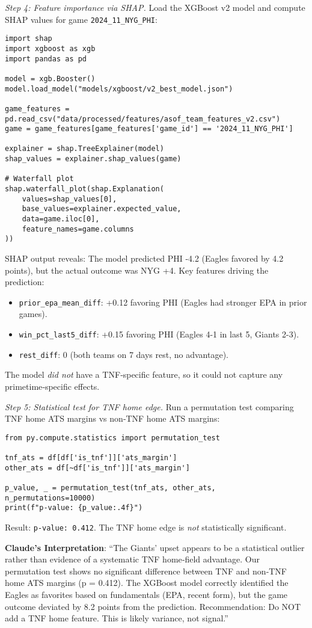 \textit{Step 4: Feature importance via SHAP.}
Load the XGBoost v2 model and compute SHAP values for game \texttt{2024\_11\_NYG\_PHI}:
\begin{verbatim}
import shap
import xgboost as xgb
import pandas as pd

model = xgb.Booster()
model.load_model("models/xgboost/v2_best_model.json")

game_features = pd.read_csv("data/processed/features/asof_team_features_v2.csv")
game = game_features[game_features['game_id'] == '2024_11_NYG_PHI']

explainer = shap.TreeExplainer(model)
shap_values = explainer.shap_values(game)

# Waterfall plot
shap.waterfall_plot(shap.Explanation(
    values=shap_values[0],
    base_values=explainer.expected_value,
    data=game.iloc[0],
    feature_names=game.columns
))
\end{verbatim}

SHAP output reveals: The model predicted PHI -4.2 (Eagles favored by 4.2 points), but the actual outcome was NYG +4. Key features driving the prediction:
\begin{itemize}
\item \texttt{prior\_epa\_mean\_diff}: +0.12 favoring PHI (Eagles had stronger EPA in prior games).
\item \texttt{win\_pct\_last5\_diff}: +0.15 favoring PHI (Eagles 4-1 in last 5, Giants 2-3).
\item \texttt{rest\_diff}: 0 (both teams on 7 days rest, no advantage).
\end{itemize}

The model \textit{did not} have a TNF‑specific feature, so it could not capture any primetime‑specific effects.

\textit{Step 5: Statistical test for TNF home edge.}
Run a permutation test comparing TNF home ATS margins vs non‑TNF home ATS margins:
\begin{verbatim}
from py.compute.statistics import permutation_test

tnf_ats = df[df['is_tnf']]['ats_margin']
other_ats = df[~df['is_tnf']]['ats_margin']

p_value, _ = permutation_test(tnf_ats, other_ats, n_permutations=10000)
print(f"p-value: {p_value:.4f}")
\end{verbatim}

Result: \texttt{p-value: 0.412}. The TNF home edge is \textit{not} statistically significant.

\textbf{Claude's Interpretation}: ``The Giants' upset appears to be a statistical outlier rather than evidence of a systematic TNF home‑field advantage. Our permutation test shows no significant difference between TNF and non‑TNF home ATS margins (p = 0.412). The XGBoost model correctly identified the Eagles as favorites based on fundamentals (EPA, recent form), but the game outcome deviated by 8.2 points from the prediction. Recommendation: Do NOT add a TNF home feature. This is likely variance, not signal.''

